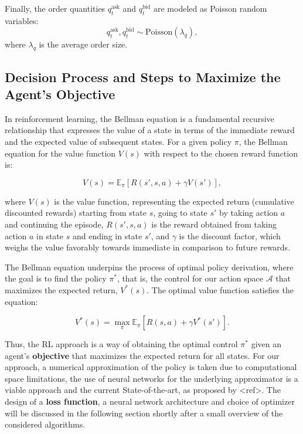 Finally, the order quantities \( q_t^{\text{ask}} \) and \( q_t^{\text{bid}} \) are modeled as Poisson random variables:
\[
    q_t^{\text{ask}}, q_t^{\text{bid}} \sim \text{Poisson}(\lambda_q),
\]
where \( \lambda_q \) is the average order size.

\subsection{Decision Process and Steps to Maximize the Agent's Objective}
\label{subsec:decision-process-and-steps-to-maximize-the-agent's-objective}

In reinforcement learning, the Bellman equation is a fundamental recursive relationship that expresses the value of a state in terms of the immediate reward and the expected value of subsequent states. For a given policy $\pi$, the Bellman equation for the value function $V(s)$ with respect to the chosen reward function is:

\[
    V(s) = \mathbb{E}_{\pi} \left[ R(s', s, a) + \gamma V(s') \right],
\]

where $V(s)$ is the value function, representing the expected return (cumulative discounted rewards) starting from state $s$, going to state $s'$ by taking action $a$ and continuing the episode, $R(s', s, a)$ is the reward obtained from taking action $a$ in state $s$ and ending in state $s'$,
and $\gamma$ is the discount factor, which weighs the value favorably towards immediate in comparison to future rewards.

The Bellman equation underpins the process of optimal policy derivation, where the goal is to find the policy $\pi^*$, that is, the control for our action space $\mathcal{A}$ that maximizes the expected return, $V^*(s)$. The optimal value function satisfies the equation:

\[
    V^*(s) = \max_{\pi} \mathbb{E}_{\pi} \left[ R(s, a) + \gamma V^*(s') \right].
\]

Thus, the RL approach is a way of obtaining the optimal control $\pi^*$ given an agent's \textbf{objective} that maximizes the expected return for all states. For our approach, a numerical approximation of the policy is taken due to computational space limitations, the use of neural networks for the underlying approximator is a viable approach and the current State-of-the-art, as proposed by <ref>. The design of a \textbf{loss function}, a neural network architecture and choice of optimizer will be discussed in the following section shortly after a small overview of the considered algorithms.

